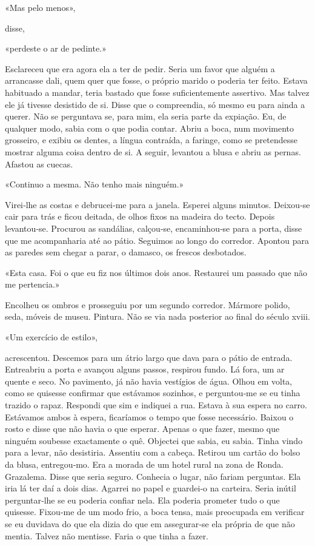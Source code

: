 «Mas pelo menos»,

disse,

«perdeste o ar de pedinte.»

Esclareceu que era agora ela a ter de pedir. Seria um favor que alguém a
arrancasse dali, quem quer que fosse, o próprio marido o poderia ter
feito. Estava habituado a mandar, teria bastado que fosse
suficientemente assertivo. Mas talvez ele já tivesse desistido de si.
Disse que o compreendia, só mesmo eu para ainda a querer. Não se
perguntava se, para mim, ela seria parte da expiação. Eu, de qualquer
modo, sabia com o que podia contar. Abriu a boca, num movimento
grosseiro, e exibiu os dentes, a língua contraída, a faringe, como se
pretendesse mostrar alguma coisa dentro de si. A seguir, levantou a
blusa e abriu as pernas. Afastou as cuecas.

«Continuo a mesma. Não tenho mais ninguém.»

Virei­‑lhe as costas e debrucei­‑me para a janela. Esperei alguns
minutos. Deixou­‑se cair para trás e ficou deitada, de olhos fixos na
madeira do tecto. Depois levantou­‑se. Procurou as sandálias,
calçou­‑se, encaminhou­‑se para a porta, disse que me acompanharia até
ao pátio. Seguimos ao longo do corredor. Apontou para as paredes sem
chegar a parar, o damasco, os frescos desbotados.

«Esta casa. Foi o que eu fiz nos últimos dois anos. Restaurei um passado
que não me pertencia.»

Encolheu os ombros e prosseguiu por um segundo corredor. Mármore polido,
seda, móveis de museu. Pintura. Não se via nada posterior ao final do
século xviii.

«Um exercício de estilo»,

acrescentou. Descemos para um átrio largo que dava para o pátio de
entrada. Entreabriu a porta e avançou alguns passos, respirou fundo. Lá
fora, um ar quente e seco. No pavimento, já não havia vestígios de água.
Olhou em volta, como se quisesse confirmar que estávamos sozinhos, e
perguntou­‑me se eu tinha trazido o rapaz. Respondi que sim e indiquei a
rua. Estava à sua espera no carro. Estávamos ambos à espera, ficaríamos
o tempo que fosse necessário. Baixou o rosto e disse que não havia o que
esperar. Apenas o que fazer, mesmo que ninguém soubesse exactamente o
quê. Objectei que sabia, eu sabia. Tinha vindo para a levar, não
desistiria. Assentiu com a cabeça. Retirou um cartão do bolso da blusa,
entregou­‑mo. Era a morada de um hotel rural na zona de Ronda.
Grazalema. Disse que seria seguro. Conhecia o lugar, não fariam
perguntas. Ela iria lá ter daí a dois dias. Agarrei no papel e
guardei­‑o na carteira. Seria inútil perguntar­‑lhe se eu poderia
confiar nela. Ela poderia prometer tudo o que quisesse. Fixou­‑me de um
modo frio, a boca tensa, mais preocupada em verificar se eu duvidava do
que ela dizia do que em assegurar­‑se ela própria de que não mentia.
Talvez não mentisse. Faria o que tinha a fazer.

